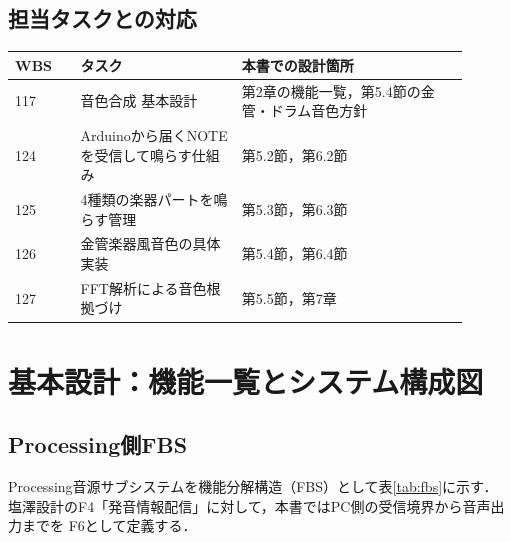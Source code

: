 \documentclass[a4paper,11pt]{jsarticle}
\begin{document}
\subsection{担当タスクとの対応}

\begin{longtable}{p{0.13\linewidth}p{0.32\linewidth}p{0.45\linewidth}}
\toprule
WBS & タスク & 本書での設計箇所 \\
\midrule
\endhead
117 & 音色合成 基本設計 & 第2章の機能一覧，第5.4節の金管・ドラム音色方針 \\
124 & Arduinoから届くNOTEを受信して鳴らす仕組み & 第5.2節，第6.2節 \\
125 & 4種類の楽器パートを鳴らす管理 & 第5.3節，第6.3節 \\
126 & 金管楽器風音色の具体実装 & 第5.4節，第6.4節 \\
127 & FFT解析による音色根拠づけ & 第5.5節，第7章 \\
\bottomrule
\end{longtable}

\newpage
\section{基本設計：機能一覧とシステム構成図}

\subsection{Processing側FBS}

Processing音源サブシステムを機能分解構造（FBS）として表\ref{tab:fbs}に示す．
塩澤設計のF4「発音情報配信」に対して，本書ではPC側の受信境界から音声出力までを
F6として定義する．
\end{document}
